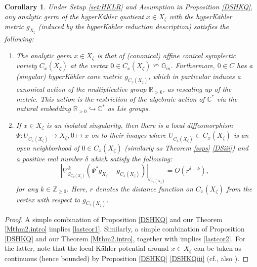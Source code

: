 \documentclass[12pt,a4paper]{amsart}
\newtheorem{Cor}[Thm]{Corollary}
\theoremstyle{remark}
\theoremstyle{definition}
\def\R{\mathbb{R}}
\def\C{\mathbb{C}}
\def\Z{\mathbb{Z}}
\begin{document}
\begin{Cor}\label{torus.HKQ}
Under Setup \ref{set:HKLR} and Assumption in Proposition \ref{DSHKQ}, 
any analytic germ of the hyperK\"ahler quotient 
$x\in X_\zeta$ with the hyperK\"ahler metric 
$g_{X_\zeta}$ 
(induced by the hyperK\"ahler reduction description) 
satisfies the following: 
\begin{enumerate}
\item \label{lastcor1}
The analytic germ 
$x\in X_\zeta$ 
is that of (canonical) 
affine conical symplectic variety $C_x(X_{\zeta})$ 
at the vertex $0\in C_x(X_{\zeta})\curvearrowleft \mathbb{G}_m$. 
Furthermore, $0\in C$ has a (singular) hyperK\"ahler cone  metric 
$g_{C_x(X_{\zeta})}$, %
which in particular induces a canonical action 
of 
the multiplicative group $\R_{>0}$, 
as rescaling up of the metric. This action is the restriction of  
the algebraic action of $\C^*$ 
via the natural embedding $\R_{>0}\hookrightarrow \C^*$ 
as Lie groups. 

\item \label{lastcor2}
If $x\in X_\zeta$ is an isolated singularity, 
then there is a local diffeomorphism  $\Psi\colon U_{C_x(X_{\zeta})} \to X_\zeta, 0\mapsto x$ on to their images where 
$U_{C_x(X_{\zeta})} \subset C_x(X_{\zeta})$ is an open neighborhood of $0\in C_x(X_{\zeta})$
(similarly as Theorem \ref{ssps} \eqref{DSiii}) and a 
positive real number $\delta$ 
which satisfy the following: 
$$|\nabla^k_{g_{C_x(X_{\zeta})}}(\Psi ^*g_{X_\zeta} -g_{C_x(X_{\zeta})})|_{g_{C_x(X_{\zeta})}}=O(r^{\delta-k}),$$ 
for any $k\in \Z_{\ge 0}$. Here, $r$ denotes the 
distance function on $C_x(X_{\zeta})$ from the vertex with respect to 
$g_{C_x(X_{\zeta})}$. 
\end{enumerate}
\end{Cor}

\begin{proof}
A simple combination of 
Proposition \ref{DSHKQ} and our Theorem \ref{Mthm2.intro} 
implies \eqref{lastcor1}. 
Similarly, a simple combination of 
Proposition \ref{DSHKQ} and our Theorem \ref{Mthm2.intro}, 
together with \cite[Theorem 1.4]{Zha24} 
implies \eqref{lastcor2}. For the latter, note that the local 
K\"ahler potential around $x\in X_\zeta$ can be taken as continuous (hence bounded) 
by Proposition \ref{DSHKQ} \eqref{DSHKQiii} 
(cf., also \cite[\S 3 E]{HKLR}). 
\end{proof}
\end{document}
